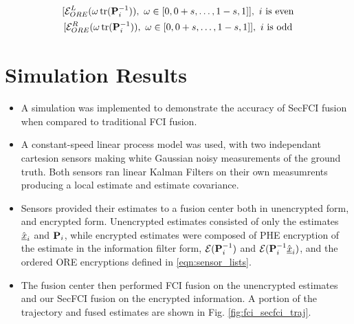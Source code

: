 \documentclass[letterpaper, 10 pt, conference]{ieeeconf}  %
\begin{document}
\begin{equation}
   \begin{gathered} \label{eqn:sensor_lists}
      [\mathcal{E}^L_{ORE}(\omega\tr(\mP^{-1}_i)),\ \omega \in [0,0+s,\dots,1-s,1]],\ i\text{ is even} \\
      [\mathcal{E}^R_{ORE}(\omega\tr(\mP^{-1}_i)),\ \omega \in [0,0+s,\dots,1-s,1]],\ i\text{ is odd}
   \end{gathered}
\end{equation}




\section{Simulation Results}
\begin{itemize}
   \item A simulation was implemented to demonstrate the accuracy of SecFCI fusion when compared to traditional FCI fusion.
   \item A constant-speed linear process model was used, with two independant cartesion sensors making white Gaussian noisy measurements of the ground truth. Both sensors ran linear Kalman Filters \cite{} on their own measumrents producing a local estimate and estimate covariance. 
   \item Sensors provided their estimates to a fusion center both in unencrypted form, and encrypted form. Unencrypted estimates consisted of only the estimates $\hat{{\underline{x}}}_i$ and ${{\mathbf{P}}}_i$, while encrypted estimates were composed of PHE encryption of the estimate in the information filter form, $\mathcal{E}({{\mathbf{P}}}^{-1}_i)$ and $\mathcal{E}({{\mathbf{P}}}^{-1}_i\hat{{\underline{x}}}_i)$, and the ordered ORE encryptions defined in \eqref{eqn:sensor_lists}.
   \item The fusion center then performed FCI fusion on the unencrypted estimates and our SecFCI fusion on the encrypted information. A portion of the trajectory and fused estimates are shown in Fig. \ref{fig:fci_secfci_traj}.
\end{itemize}
\end{document}
